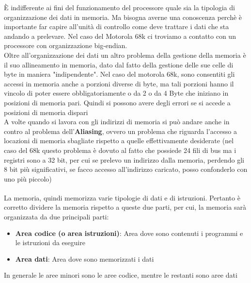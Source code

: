 \MakeUppercase{è} indifferente ai fini del funzionamento del processore quale sia la tipologia di organizzazione dei dati in memoria. Ma bisogna averne una conoscenza perchè è importante far capire all'unità di controllo come deve trattare i dati che sta andando a prelevare. Nel caso del Motorola 68k ci troviamo a contatto con un processore con organizzazione big-endian.
\\
Oltre all'organizzazione dei dati un altro problema della gestione della memoria è il suo allineamento in memoria, dato dal fatto della gestione delle sue celle di byte in maniera "indipendente".
Nel caso del motorola 68k, sono consentiti gli accessi in memoria anche a porzioni diverse di byte, ma tali porzioni hanno il vincolo di poter essere obbligatoriamente o da 2 o da 4 Byte che iniziano in posizioni di memoria pari. Quindi si possono avere degli errori se si accede a posizioni di memoria dispari
\\
A volte quando si lavora con gli indirizzi di memoria si può andare anche in contro al problema dell'\textbf{Aliasing}, ovvero un problema che riguarda l'accesso a locazioni di memoria sbagliate rispetto a quelle effettivamente desiderate (nel caso del 68k questo problema è dovuto al fatto che possiede 24 fili di bus ma i registri sono a 32 bit, per cui se prelevo un indirizzo dalla memoria, perdendo gli 8 bit più significativi, se facco accesso all'indirizzo caricato, posso confonderlo con uno più piccolo)
\\
\\
La memoria, quindi memorizza varie tipologie di dati e di istruzioni. Pertanto è corretto dividere la memoria rispetto a queste due parti, per cui, la memoria sarà organizzata da due principali parti:

\begin{itemize}
    \item \textbf{Area codice (o area istruzioni)}: Area dove sono contenuti i programmi e le istruzioni da eseguire
    \item \textbf{Area dati}: Area dove sono memorizzati i dati
\end{itemize}

In generale le aree minori sono le aree codice, mentre le restanti sono aree dati

